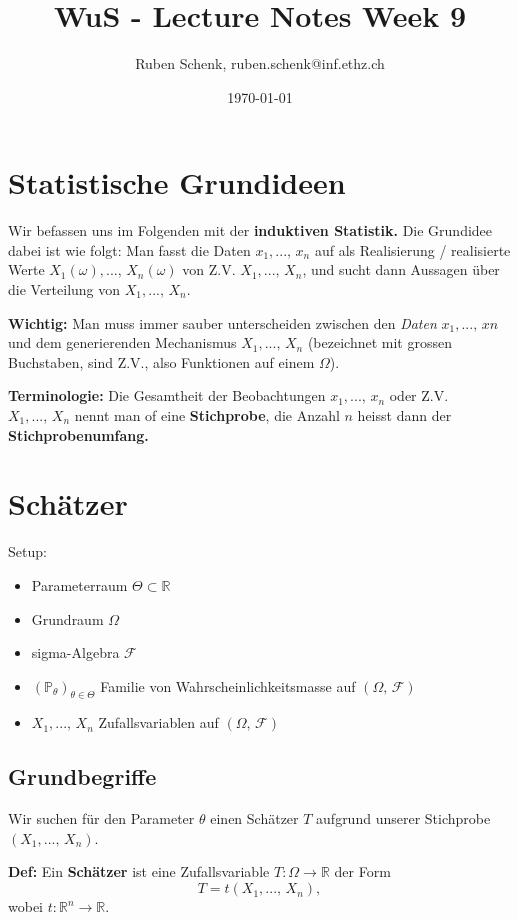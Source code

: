 \documentclass[a4paper]{extarticle}
\title{WuS - Lecture Notes Week 9}
\author{Ruben Schenk, ruben.schenk@inf.ethz.ch}
\date{\today}
\begin{document}
\maketitle

\section{Statistische Grundideen}

Wir befassen uns im Folgenden mit der \textbf{induktiven Statistik.} Die Grundidee dabei ist wie folgt: Man fasst die Daten $x_1,..., \, x_n$ auf als Realisierung / realisierte Werte $X_1(\omega),..., \, X_n(\omega)$ von Z.V. $X_1,..., \, X_n$, und sucht dann Aussagen über die Verteilung von $X_1,..., \, X_n$.

\textbf{Wichtig:} Man muss immer sauber unterscheiden zwischen den \textit{Daten} $x_1,..., \, xn$ und dem generierenden Mechanismus $X_1,..., \, X_n$ (bezeichnet mit grossen Buchstaben, sind Z.V., also Funktionen auf einem $\Omega$).

\textbf{Terminologie:} Die Gesamtheit der Beobachtungen $x_1,..., \, x_n$ oder Z.V. $X_1,..., \, X_n$ nennt man of eine \textbf{Stichprobe}, die Anzahl $n$ heisst dann der \textbf{Stichprobenumfang.}

\section{Schätzer}

Setup:
\begin{itemize}
    \item Parameterraum $\Theta \subset \mathbb{R}$
    \item Grundraum $\Omega$
    \item sigma-Algebra $\mathcal{F}$
    \item $(\mathbb{P}_{\theta})_{\theta \in \Theta}$ Familie von Wahrscheinlichkeitsmasse auf $(\Omega, \, \mathcal{F})$
    \item $X_1,..., \, X_n$ Zufallsvariablen auf $(\Omega, \, \mathcal{F})$
\end{itemize}

\subsection{Grundbegriffe}

Wir suchen für den Parameter $\theta$ einen Schätzer $T$ aufgrund unserer Stichprobe $(X_1,..., \, X_n)$.

\textbf{Def:} Ein \textbf{Schätzer} ist eine Zufallsvariable $T : \Omega \to \mathbb{R}$ der Form
\[
    T = t(X_1,..., \, X_n),
\]
wobei $t : \mathbb{R}^n \to \mathbb{R}$.
\end{document}
